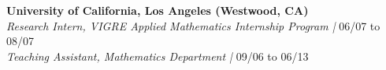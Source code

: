 {\bf  University of California, Los Angeles (Westwood, CA)}\\
{\it Research Intern, VIGRE Applied Mathematics Internship Program |} 06/07 to 08/07 \\
{\it Teaching Assistant, Mathematics Department |} 09/06 to 06/13












